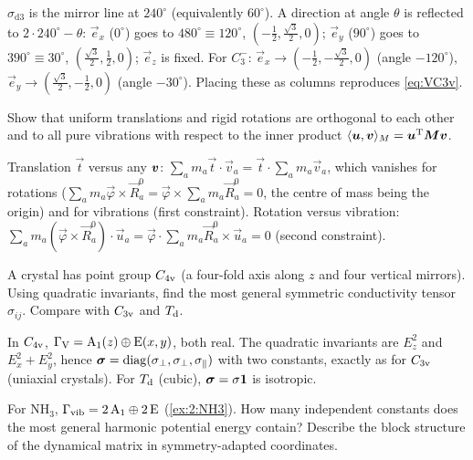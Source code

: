 \begin{solution}
$\sigma_{\mathrm{d}3}$ is the mirror line at $240^\circ$ (equivalently $60^\circ$). A
direction at angle $\theta$ is reflected to $2\cdot240^\circ-\theta$: $\vec{e}_x$
($0^\circ$) goes to $480^\circ\equiv120^\circ$, $(-\tfrac12,\tfrac{\sqrt3}{2},0)$;
$\vec{e}_y$ ($90^\circ$) goes to $390^\circ\equiv30^\circ$, $(\tfrac{\sqrt3}{2},\tfrac12,0)$;
$\vec{e}_z$ is fixed. For $C_3^-$: $\vec{e}_x\to(-\tfrac12,-\tfrac{\sqrt3}{2},0)$ (angle
$-120^\circ$), $\vec{e}_y\to(\tfrac{\sqrt3}{2},-\tfrac12,0)$ (angle $-30^\circ$). Placing
these as columns reproduces \eqref{eq:VC3v}.
\end{solution}

\begin{exercise}\label{ex:3:orthsub}
Show that uniform translations and rigid rotations are orthogonal to each other and
to all pure vibrations with respect to the inner product
$\langle \bm{u}, \bm{v}\rangle_M=\bm{u}^{\mathrm{T}}\bm{M}\bm{v}$.
\end{exercise}

\begin{solution}
Translation $\vec{t}$ versus any $\bm{v}$:
$\sum_am_a\vec{t}\cdot\vec{v}_a=\vec{t}\cdot\sum_am_a\vec{v}_a$, which vanishes for rotations
($\sum_am_a\vec{\varphi}\times\vec{R}_a^0=\vec{\varphi}\times\sum_am_a\vec{R}_a^0=0$, the centre of
mass being the origin) and for vibrations (first constraint). Rotation versus vibration:
$\sum_am_a(\vec{\varphi}\times\vec{R}_a^0)\cdot\vec{u}_a=\vec{\varphi}\cdot\sum_am_a\vec{R}_a^0\times\vec{u}_a=0$
(second constraint).
\end{solution}

\begin{exercise}\label{ex:3:cond}
A crystal has point group $C_{4\mathrm{v}}$ (a four-fold axis along $z$ and four vertical
mirrors). Using quadratic invariants, find the most general symmetric conductivity
tensor $\sigma_{ij}$. Compare with $C_{3\mathrm{v}}$ and $T_{\mathrm{d}}$.
\end{exercise}

\begin{solution}
In $C_{4\mathrm{v}}$, $\Gamma_{\mathrm{V}}=\mathrm{A}_1(z)\oplus\mathrm{E}(x,y)$, both real. The quadratic invariants are
$E_z^2$ and $E_x^2+E_y^2$, hence $\bm{\sigma}=\operatorname{diag}(\sigma_\perp,\sigma_\perp,\sigma_\parallel)$
with two constants, exactly as for $C_{3\mathrm{v}}$ (uniaxial crystals). For $T_{\mathrm{d}}$ (cubic),
$\bm{\sigma}=\sigma\bm{1}$ is isotropic.
\end{solution}

\begin{exercise}\label{ex:3:NH3pot}
For $\mathrm{NH_3}$, $\Gamma_{\mathrm{vib}}=2\,\mathrm{A}_1\oplus2\,\mathrm{E}$ (\cref{ex:2:NH3}). How many
independent constants does the most general harmonic potential energy contain?
Describe the block structure of the dynamical matrix in symmetry-adapted coordinates.
\end{exercise}

